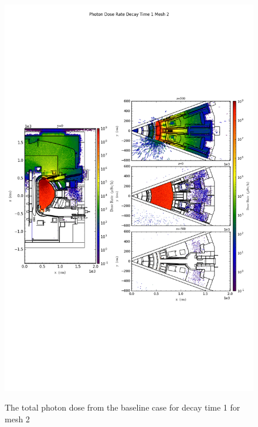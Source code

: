 \begin{figure}[ht!]
\centering
\includegraphics[trim={0cm 9cm 0cm 10cm},clip,scale=0.75]{../plots/final_model_nob4c/Photon_Dose_Rate_Decay_Time_1_Mesh_2.png}
\label{fig:photons_dc1_no4bc_m2_flux}
\caption{The total photon dose from the baseline case for decay time 1 for mesh 2}
\end{figure}
